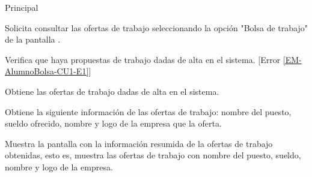 \begin{UCtrayectoria}{Principal}

	\UCpaso [\UCactor] Solicita consultar las ofertas de trabajo seleccionando la opción "Bolsa de trabajo" de la pantalla . 

	\UCpaso Verifica que haya propuestas de trabajo dadas de alta en el sistema. [Error \ref{EM-AlumnoBolsa-CU1-E1}]

	\UCpaso Obtiene las ofertas de trabajo dadas de alta en el sistema.

	\UCpaso Obtiene la siguiente información de las ofertas de trabajo: nombre del puesto, sueldo ofrecido, nombre y logo de la empresa que la oferta.

	\UCpaso Muestra la pantalla  con la información resumida de la ofertas de trabajo obtenidas, esto es, muestra las ofertas de trabajo con nombre del puesto, sueldo, nombre y logo de la empresa. 

\end{UCtrayectoria}

